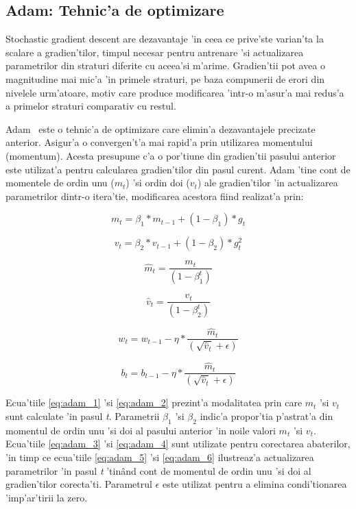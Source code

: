 \documentclass[12pt,a4paper,twoside]{report}
\begin{document}
\subsection{Adam: Tehnic'a de optimizare}
Stochastic gradient descent are dezavantaje 'in ceea ce prive'ste varian'ta la scalare a gradien'tilor, timpul necesar pentru antrenare 'si actualizarea parametrilor din straturi diferite cu aceea'si m'arime. Gradien'tii pot avea o magnitudine mai mic'a 'in primele straturi, pe baza compunerii de erori din nivelele urm'atoare, motiv care produce modificarea 'intr-o m'asur'a mai redus'a a primelor straturi comparativ cu restul.

Adam~\cite{Adam} este o tehnic'a de optimizare care elimin'a dezavantajele precizate anterior. Asigur'a o convergen't'a mai rapid'a prin utilizarea momentului (momentum). Acesta presupune c'a o por'tiune din gradien'tii pasului anterior este utilizat'a pentru calcularea gradien'tilor din pasul curent. Adam 'tine cont de momentele de ordin unu ($m_t$) 'si ordin doi ($v_t$) ale gradien'tilor 'in actualizarea parametrilor dintr-o itera'tie, modificarea acestora fiind realizat'a prin:

\begin{equation}
m_t = \beta_1 * m_{t-1} + (1 - \beta_1) * g_t
\label{eq:adam_1}
\end{equation}

\begin{equation}
v_t = \beta_2 * v_{t-1} + (1 - \beta_2) * g_t^2
\label{eq:adam_2}
\end{equation}

\begin{equation}
\hat{m}_t = \frac{m_t}{(1-\beta_1^t)}
\label{eq:adam_3}
\end{equation}

\begin{equation}
\hat{v}_t = \frac{v_t}{(1-\beta_2^t)}
\label{eq:adam_4}
\end{equation}

\begin{equation}
w_t = w_{t-1} - \eta * \frac{\hat{m}_t}{(\sqrt{\hat{v}_t} + \epsilon)}
\label{eq:adam_5}
\end{equation}

\begin{equation}
b_t = b_{t-1} - \eta * \frac{\hat{m}_t}{(\sqrt{\hat{v}_t} + \epsilon)}
\label{eq:adam_6}
\end{equation}

Ecua'tiile \ref{eq:adam_1} 'si \ref{eq:adam_2} prezint'a modalitatea prin care \textit{$m_t$} 'si \textit{$v_t$} sunt calculate 'in pasul \textit{t}. Parametrii \textit{$\beta_1$} 'si \textit{$\beta_2$} indic'a propor'tia p'astrat'a din momentul de ordin unu 'si doi al pasului anterior 'in noile valori \textit{$m_t$} 'si \textit{$v_t$}. Ecua'tiile \ref{eq:adam_3} 'si \ref{eq:adam_4} sunt utilizate pentru corectarea abaterilor, 'in timp ce ecua'tiile  \ref{eq:adam_5} 'si \ref{eq:adam_6} ilustreaz'a actualizarea parametrilor 'in pasul \textit{t} 'tin\^and cont de momentul de ordin unu 'si doi al gradien'tilor corecta'ti. Parametrul $\epsilon$ este utilizat pentru a elimina condi'tionarea 'imp'ar'tirii la zero. 
\end{document}

